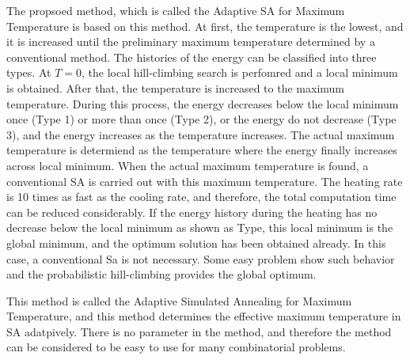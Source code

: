 \documentclass[pdftex,11pt]{article}
\begin{document}
The propsoed method, which is called the Adaptive SA for Maximum Temperature is based on this method. At first, the temperature is the lowest, and it is increased until the preliminary maximum temperature determined by a conventional method. The histories of  the energy can be classified into three types. At $T = 0$, the local hill-climbing search is perfomred and a local minimum is obtained. After that, the temperature is increased to the maximum temperature. During this process, the energy decreases below the local minimum once (Type 1) or more than once (Type 2), or the energy do not decrease (Type 3), and the energy increases as the temperature increases. The actual maximum temperature is determiend as the temperature where the energy finally increases across local minimum. When the actual maximum temperature is found, a conventional SA is carried out with this maximum temperature. The heating rate is 10 times as fast as the cooling rate, and therefore, the total computation time can be reduced considerably. If the energy history during the heating has no decrease below the local minimum as shown as Type, this local minimum is the global minimum, and the optimum solution has been obtained already. In this case, a conventional Sa is not necessary. Some easy problem show such behavior and the probabilistic hill-climbing provides the global optimum.

This method is called the Adaptive Simulated Annealing for Maximum Temperature, and this method determines the effective maximum temperature in SA adatpively. There is no parameter in the method, and therefore the method can be considered to be easy to use for many combinatorial problems.
\end{document}
